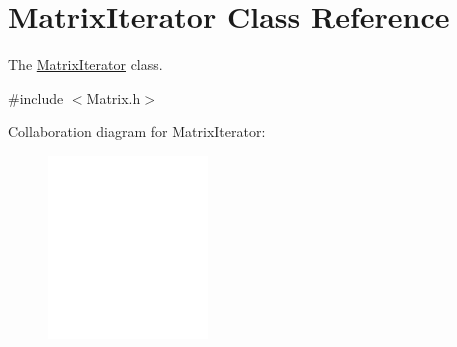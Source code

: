 \hypertarget{class_matrix_iterator}{
\section{MatrixIterator Class Reference}
\label{class_matrix_iterator}
}


The \hyperlink{class_matrix_iterator}{MatrixIterator} class.  




{\ttfamily \#include $<$Matrix.h$>$}



Collaboration diagram for MatrixIterator:\nopagebreak
\begin{figure}[H]
\begin{center}
\leavevmode
\includegraphics[width=120pt]{class_matrix_iterator__coll__graph}
\end{center}
\end{figure}
